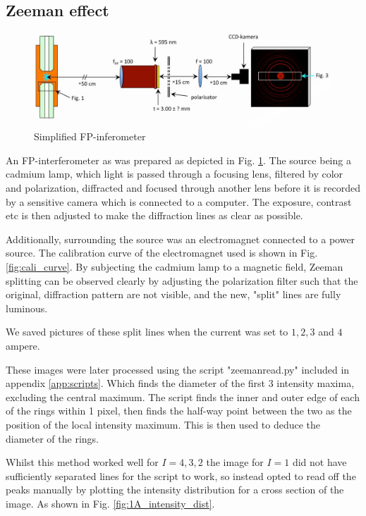 \documentclass[11pt,a4paper]{article}
\begin{document}
    \subsection{Zeeman effect\label{sect:zeeman_expt}}
      \begin{figure}[H]
        \center
        \includegraphics[width=15cm]{scripts/figs/ZEEMAN_EXPERIMENTAL.png}
        \caption{Simplified FP-inferometer}
        \label{FP-inferometer}
      \end{figure}

      An FP-interferometer as was prepared as depicted in Fig. \ref{FP-inferometer}. The source being a cadmium lamp, which light is passed through a focusing lens, filtered by color and polarization, diffracted and focused through another lens before it is recorded by a sensitive camera which is connected to a computer. The exposure, contrast etc is then adjusted to make the diffraction lines as clear as possible.

      Additionally, surrounding the source was an electromagnet connected to a power source. The calibration curve of the electromagnet used is shown in Fig. \ref{fig:cali_curve}. By subjecting the cadmium lamp to a magnetic field, Zeeman splitting can be observed clearly by adjusting the polarization filter such that the original, diffraction pattern are not visible, and the new, "split" lines are fully luminous.

      We saved pictures of these split lines when the current was set to $1, 2, 3$ and $4$ ampere.

      These images were later processed using the script "zeemanread.py" included in appendix \ref{app:scripts}. Which finds the diameter of the first 3 intensity maxima, excluding the central maximum. The script finds the inner and outer edge of each of the rings within 1 pixel, then finds the half-way point between the two as the position of the local intensity maximum. This is then used to deduce the diameter of the rings.

      Whilst this method worked well for $I = 4, 3, 2$ the image for $I=1$ did not have sufficiently separated lines for the script to work, so instead opted to read off the peaks manually by plotting the intensity distribution for a cross section of the image. As shown in Fig. \ref{fig:1A_intensity_dist}.
\end{document}
